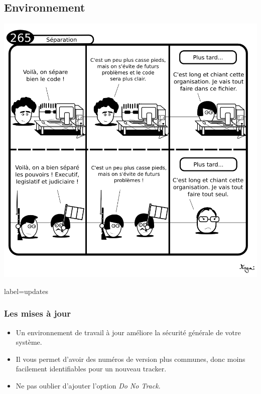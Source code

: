 \documentclass{beamer}
\begin{document}
    \subsection{Environnement}
        \begin{frame}
            \begin{center}
                \includegraphics[scale=0.35]{img/265-separation.png}
            \end{center}
        \end{frame}
        \begin{frame}{label=updates}
            \frametitle{Les mises à jour}
            \begin{center}
                \begin{itemize}
                    \item Un environnement de travail à jour améliore la sécurité générale de votre système.
                    \item Il vous permet d'avoir des numéros de version plus communes, donc moins facilement identifiables pour un nouveau tracker.
                    \item Ne pas oublier d'ajouter l'option \textit{Do No Track}.
                \end{itemize}
            \end{center}
        \end{frame}
\end{document}
